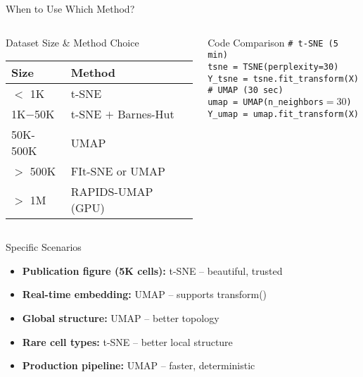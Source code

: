 \documentclass[aspectratio=169]{beamer}
\begin{document}
\begin{frame}{When to Use Which Method?}

\begin{columns}
\begin{block}{Dataset Size \& Method Choice}
\begin{tabular}{ll}
\textbf{Size} & \textbf{Method} \\
\hline
$<$ 1K & t-SNE \\
1K$-$50K & t-SNE $+$ Barnes-Hut \\
50K-500K & UMAP \\
$>$ 500K & FIt-SNE or UMAP \\
$>$ 1M & RAPIDS-UMAP (GPU) \\
\end{tabular}
\end{block}

\begin{block}{Code Comparison}
\texttt{\# t-SNE (5 min)}\\
\texttt{tsne = TSNE(perplexity=30)}\\
\texttt{Y\_tsne = tsne.fit\_transform(X)}\\
\vspace{0.2cm}
\texttt{\# UMAP (30 sec)}\\
\texttt{umap = UMAP(n\_neighbors$=30$)}\\
\texttt{Y\_umap = umap.fit\_transform(X)}
\end{block}
\end{columns}

\vspace{0.3cm}

\begin{block}{Specific Scenarios}
\begin{itemize}
    \item \textbf{Publication figure (5K cells):} t-SNE -- beautiful, trusted
    \item \textbf{Real-time embedding:} UMAP -- supports transform()
    \item \textbf{Global structure:} UMAP -- better topology
    \item \textbf{Rare cell types:} t-SNE -- better local structure
    \item \textbf{Production pipeline:} UMAP -- faster, deterministic
\end{itemize}
\end{block}

\end{frame}
\end{document}
